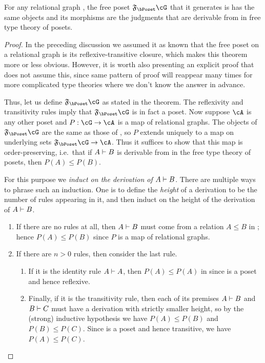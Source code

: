 \begin{thm}\label{thm:poset-initial-1}
  For any relational graph \cG, the free poset $\F{\bPoset}\cG$ that it generates is has the same objects and its morphisms are the judgments that are derivable from \cG in free type theory of posets.
\end{thm}
\begin{proof}
  In the preceding discussion we assumed it as known that the free poset on a relational graph is its reflexive-transitive closure, which makes this theorem more or less obvious.
  However, it is worth also presenting an explicit proof that does not assume this, since same pattern of proof will reappear many times for more complicated type theories where we don't know the answer in advance.

  Thus, let us define $\F{\bPoset}\cG$ as stated in the theorem.
  The reflexivity and transitivity rules imply that $\F{\bPoset}\cG$ is in fact a poset.
  Now suppose $\cA$ is any other poset and $P:\cG\to\cA$ is a map of relational graphs.
  The objects of $\F{\bPoset}\cG$ are the same as those of \cG, so $P$ extends uniquely to a map on underlying sets $\F{\bPoset}\cG\to\cA$.
  Thus it suffices to show that this map is order-preserving, i.e.\ that if $A\vdash B$ is derivable from \cG in the free type theory of posets, then $P(A)\le P(B)$.

  For this purpose we \emph{induct on the derivation of $A\vdash B$}.
  There are multiple ways to phrase such an induction.
  One is to define the \emph{height} of a derivation to be the number of rules appearing in it, and then induct on the height of the derivation of $A\vdash B$.
  \begin{enumerate}
  \item If there are no rules at all, then $A\vdash B$ must come from a relation $A\le B$ in \cG; hence $P(A)\le P(B)$ since $P$ is a map of relational graphs.
  \item If there are $n>0$ rules, then consider the last rule.
    \begin{enumerate}
    \item If it is the identity rule $A\vdash A$, then $P(A)\le P(A)$ in \cA since \cA is a poset and hence reflexive.
    \item Finally, if it is the transitivity rule, then each of its premises $A\vdash B$ and $B\vdash C$ must have a derivation with strictly smaller height, so by the (strong) inductive hypothesis we have $P(A)\le P(B)$ and $P(B)\le P(C)$.
      Since \cA is a poset and hence transitive, we have $P(A)\le P(C)$.\qedhere
    \end{enumerate}
  \end{enumerate}
\end{proof}

